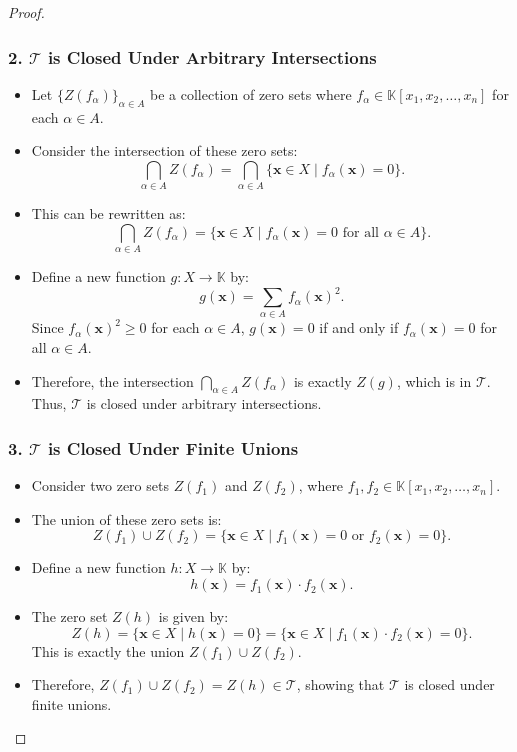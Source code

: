 \documentclass[11pt,openany]{article}
\begin{document}
\begin{proof}
\subsubsection*{2. \( \mathcal{T} \) is Closed Under Arbitrary Intersections}
\begin{itemize}
	\item[-] Let \( \{ Z(f_\alpha) \}_{\alpha \in A} \) be a collection of zero sets where \( f_\alpha \in \mathbb{K}[x_1, x_2, \dots, x_n] \) for each \( \alpha \in A \).
	\item[-] Consider the intersection of these zero sets:
	\[
	\bigcap_{\alpha \in A} Z(f_\alpha) = \bigcap_{\alpha \in A} \{ \mathbf{x} \in X \mid f_\alpha(\mathbf{x}) = 0 \}.
	\]
	\item[-]  This can be rewritten as:
	\[
	\bigcap_{\alpha \in A} Z(f_\alpha) = \{ \mathbf{x} \in X \mid f_\alpha(\mathbf{x}) = 0 \text{ for all } \alpha \in A \}.
	\]
	\item[-] Define a new function \( g: X \to \mathbb{K} \) by:
	\[
	g(\mathbf{x}) = \sum_{\alpha \in A} f_\alpha(\mathbf{x})^2.
	\]
	Since \( f_\alpha(\mathbf{x})^2 \geq 0 \) for each \( \alpha \in A \), \( g(\mathbf{x}) = 0 \) if and only if \( f_\alpha(\mathbf{x}) = 0 \) for all \( \alpha \in A \).
	\item[-] Therefore, the intersection \( \bigcap_{\alpha \in A} Z(f_\alpha) \) is exactly \( Z(g) \), which is in \( \mathcal{T} \). Thus, \( \mathcal{T} \) is closed under arbitrary intersections.
\end{itemize}

\subsubsection*{3. \( \mathcal{T} \) is Closed Under Finite Unions}
\begin{itemize}
	\item[-] Consider two zero sets \( Z(f_1) \) and \( Z(f_2) \), where \( f_1, f_2 \in \mathbb{K}[x_1, x_2, \dots, x_n] \).
	\item[-] The union of these zero sets is:
	\[
	Z(f_1) \cup Z(f_2) = \{ \mathbf{x} \in X \mid f_1(\mathbf{x}) = 0 \text{ or } f_2(\mathbf{x}) = 0 \}.
	\]
	\item[-] Define a new function \( h: X \to \mathbb{K} \) by:
	\[
	h(\mathbf{x}) = f_1(\mathbf{x}) \cdot f_2(\mathbf{x}).
	\]
	\item[-] The zero set \( Z(h) \) is given by:
	\[
	Z(h) = \{ \mathbf{x} \in X \mid h(\mathbf{x}) = 0 \} = \{ \mathbf{x} \in X \mid f_1(\mathbf{x}) \cdot f_2(\mathbf{x}) = 0 \}.
	\]
	This is exactly the union \( Z(f_1) \cup Z(f_2) \).
	\item[-] Therefore, \( Z(f_1) \cup Z(f_2) = Z(h) \in \mathcal{T} \), showing that \( \mathcal{T} \) is closed under finite unions.
\end{itemize}
\end{proof}
\newpage
\end{document}

